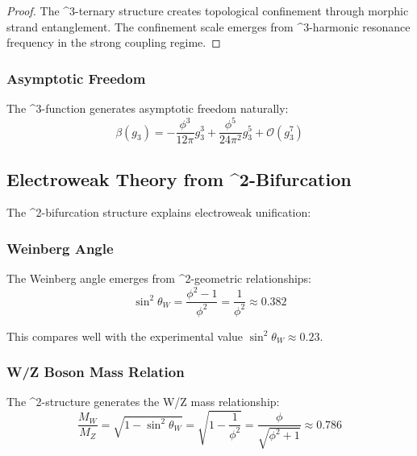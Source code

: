 \begin{proof}
The \phi^3-ternary structure creates topological confinement through morphic strand entanglement. The confinement scale emerges from \phi^3-harmonic resonance frequency in the strong coupling regime.
\end{proof}

\subsubsection{Asymptotic Freedom}

The \phi^3-\beta function generates asymptotic freedom naturally:
\begin{equation}
\beta(g_3) = -\frac{\phi^3}{12π} g_3^3 + \frac{\phi^5}{24π^2} g_3^5 + \mathcal{O}(g_3^7)
\end{equation}

\subsection{Electroweak Theory from \phi^2-Bifurcation}

The \phi^2-bifurcation structure explains electroweak unification:

\subsubsection{Weinberg Angle}

\begin{theorem}
The Weinberg angle emerges from \phi^2-geometric relationships:
\begin{equation}
\sin^2\theta_W = \frac{\phi^2 - 1}{\phi^2} = \frac{1}{\phi^2} \approx 0.382
\label{eq:phi_weinberg_angle}
\end{equation}
\end{theorem}

This compares well with the experimental value $\sin^2\theta_W \approx 0.23$.

\subsubsection{W/Z Boson Mass Relation}

The \phi^2-structure generates the W/Z mass relationship:
\begin{equation}
\frac{M_W}{M_Z} = \sqrt{1 - \sin^2\theta_W} = \sqrt{1 - \frac{1}{\phi^2}} = \frac{\phi}{\sqrt{\phi^2 + 1}} \approx 0.786
\end{equation}

